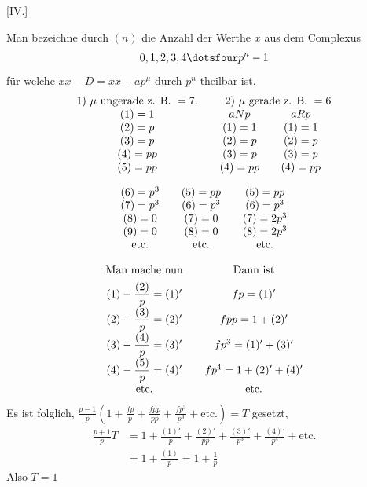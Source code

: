 \par\bigskip{}\centerline{[IV.]}\medskip
Man bezeichne durch $(n)$ die Anzahl der Werthe $x$ aus dem Complexus
\[
0,1,2,3,4\dotsfour p^n-1
\]
für welche $xx-D=xx-ap^\mu$ durch $p^n$ theilbar ist.
\[
\begin{array}{c@{\qquad}cc}
1)\ \mu\text{ ungerade z. B. }=7.&\multicolumn2c{2)\ \mu\text{ gerade z. B. }=6}\\
(1)=1&aNp&aRp\\
(2)=p&(1)=1&(1)=1\\
(3)=p&(2)=p&(2)=p\\
(4)=pp&(3)=p&(3)=p\\
(5)=pp&(4)=pp&(4)=pp
\end{array}
\]

\[
\begin{array}{c@{\qquad}c@{\qquad}c}
(6)=p^3&(5)=pp&(5)=pp\\
(7)=p^3&(6)=p^3&(6)=p^3\\
(8)=0&(7)=0&(7)=2p^3\\
(9)=0&(8)=0&(8)=2p^3\\
\text{etc.}&\text{etc.}&\text{etc.}
\end{array}
\]

\[
\begin{array}{c@{\qquad}c}
\text{Man mache nun}&\text{Dann ist}\\[.4em]
(1)-\dfrac{(2)}p=(1)'&fp=(1)'\\[.4em]
(2)-\dfrac{(3)}p=(2)'&fpp=1+(2)'\\[.4em]
(3)-\dfrac{(4)}p=(3)'&fp^3=(1)'+(3)'\\[.4em]
(4)-\dfrac{(5)}p=(4)'&fp^4=1+(2)'+(4)'\\
\text{etc.}&\text{etc.}
\end{array}
\]
Es ist folglich, $\frac{p-1}p(1+\frac{fp}p+\frac{fpp}{pp}+\frac{fp^3}{p^3}+\text{etc.})=T$ gesetzt,
\[
\begin{aligned}
\frac{p+1}p T&=1+\frac{(1)'}p+\frac{(2)'}{pp}+\frac{(3)'}{p^3}+\frac{(4)'}{p^4}+\text{etc.}\\
&=1+\frac{(1)}p=1+\frac1p
\end{aligned}
\]
Also $T=1$
